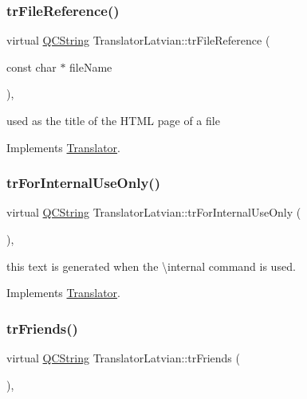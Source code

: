 \subsubsection{\texorpdfstring{trFileReference()}{trFileReference()}}
{\footnotesize\ttfamily virtual \mbox{\hyperlink{class_q_c_string}{Q\+C\+String}} Translator\+Latvian\+::tr\+File\+Reference (\begin{DoxyParamCaption}\item[{const char $\ast$}]{file\+Name }\end{DoxyParamCaption})\hspace{0.3cm}{\ttfamily [inline]}, {\ttfamily [virtual]}}

used as the title of the H\+T\+ML page of a file 

Implements \mbox{\hyperlink{class_translator}{Translator}}.

\mbox{\label{class_translator_latvian_aa90c53a7b5d3262232ded2c89a11062e}} 
\subsubsection{\texorpdfstring{trForInternalUseOnly()}{trForInternalUseOnly()}}
{\footnotesize\ttfamily virtual \mbox{\hyperlink{class_q_c_string}{Q\+C\+String}} Translator\+Latvian\+::tr\+For\+Internal\+Use\+Only (\begin{DoxyParamCaption}{ }\end{DoxyParamCaption})\hspace{0.3cm}{\ttfamily [inline]}, {\ttfamily [virtual]}}

this text is generated when the \textbackslash{}internal command is used. 

Implements \mbox{\hyperlink{class_translator}{Translator}}.

\mbox{\label{class_translator_latvian_a0a1d89b67fe87f1c834c650c6fe1ab15}} 
\subsubsection{\texorpdfstring{trFriends()}{trFriends()}}
{\footnotesize\ttfamily virtual \mbox{\hyperlink{class_q_c_string}{Q\+C\+String}} Translator\+Latvian\+::tr\+Friends (\begin{DoxyParamCaption}{ }\end{DoxyParamCaption})\hspace{0.3cm}{\ttfamily [inline]}, {\ttfamily [virtual]}}

